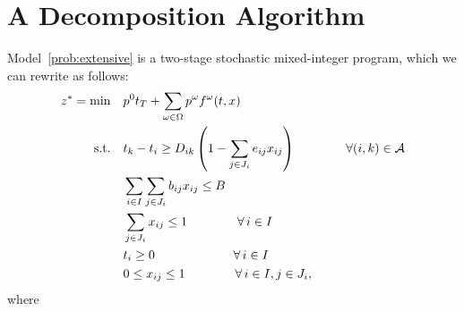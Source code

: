 \documentclass[11pt]{article}
\newcommand{\cA}{{\cal A}}
\newcommand{\noi}{\noindent}
\begin{document}
	\section{A Decomposition Algorithm} \label{sec:decomposition}
	Model~\eqref{prob:extensive} is a two-stage stochastic mixed-integer program, which we can rewrite as follows:
	\begin{subequations}
		\label{prob:masterOri}
		\begin{align}
		z^* = \min \quad &p^0 t_T + \sum_{\omega \in \Omega} p^\omega f^\omega(t,x)\\
		\text{s.t.} \quad & t_k - t_i \geq D_{ik} \left (1 - \sum_{j \in J_i} e_{ij} x_{ij} \right ) \qquad \qquad \forall (i,k) \in \cA \label{cons:MSep}\\
		& \sum_{i \in I} \sum_{j \in J_i} b_{ij}x_{ij} \leq B  \label{cons:MBudget}\\
		& \sum_{j \in J_i} x_{ij} \leq 1  \qquad \qquad \forall \,i \in I \label{cons:MSingleBudget}\\
		& {t_i \geq 0} \qquad \qquad \qquad \; \forall \,i \in I\\
		& 0 \leq x_{ij} \leq 1 \qquad \qquad \forall \,i \in I, j \in J_i, \label{cons:Mxbounds}
		\end{align}
	\end{subequations}
	\noi where
\end{document}

